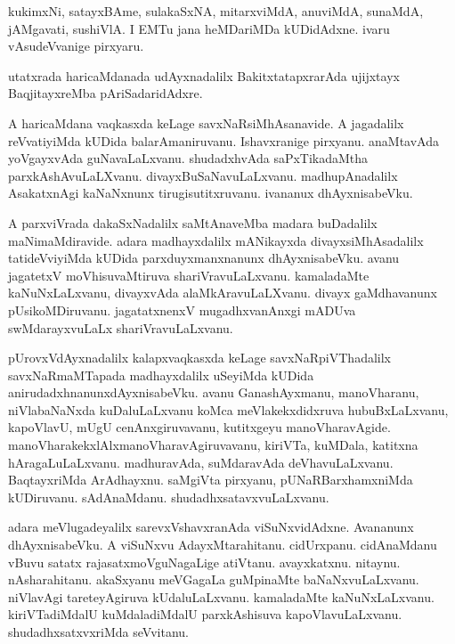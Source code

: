 \documentclass{article}
\begin{document}
\begin{mn}%
kukimxNi, satayxBAme, sulakaSxNA, mitarxviMdA, anuviMdA, sunaMdA, jAMgavati, sushiVlA. I 
EMTu jana heMDariMDa kUDidAdxne. ivaru vAsudeVvanige pirxyaru.
\end{mn}

\begin{mn}%
utatxrada haricaMdanada udAyxnadalilx BakitxtatapxrarAda ujijxtayx BaqjitayxreMba 
pAriSadaridAdxre.
\end{mn}

\begin{mn}%
A haricaMdana vaqkasxda keLage savxNaRsiMhAsanavide. A jagadalilx reVvatiyiMda kUDida 
balarAmaniruvanu. Ishavxranige pirxyanu. anaMtavAda yoVgayxvAda guNavaLaLxvanu. 
shudadxhvAda saPxTikadaMtha parxkAshAvuLaLXvanu. divayxBuSaNavuLaLxvanu. madhupAnadalilx 
AsakatxnAgi kaNaNxnunx tirugisutitxruvanu. ivananux dhAyxnisabeVku.
\end{mn}

\begin{mn}%
A parxviVrada dakaSxNadalilx saMtAnaveMba madara buDadalilx maNimaMdiravide. adara 
madhayxdalilx mANikayxda divayxsiMhAsadalilx tatideVviyiMda kUDida parxduyxmanxnanunx 
dhAyxnisabeVku. avanu jagatetxV moVhisuvaMtiruva shariVravuLaLxvanu. kamaladaMte 
kaNuNxLaLxvanu, divayxvAda alaMkAravuLaLXvanu. divayx gaMdhavanunx pUsikoMDiruvanu. 
jagatatxnenxV mugadhxvanAnxgi mADUva swMdarayxvuLaLx shariVravuLaLxvanu.
\end{mn}

\begin{mn}%
pUrovxVdAyxnadalilx kalapxvaqkasxda keLage savxNaRpiVThadalilx savxNaRmaMTapada 
madhayxdalilx uSeyiMda kUDida anirudadxhnanunxdAyxnisabeVku. avanu  GanashAyxmanu, 
manoVharanu, niVlabaNaNxda kuDaluLaLxvanu koMca meVlakekxdidxruva hubuBxLaLxvanu, 
kapoVlavU, mUgU cenAnxgiruvavanu, kutitxgeyu manoVharavAgide. 
manoVharakekxlAlxmanoVharavAgiruvavanu, kiriVTa, kuMDala, katitxna hAragaLuLaLxvanu. 
madhuravAda, suMdaravAda deVhavuLaLxvanu. BaqtayxriMda ArAdhayxnu. saMgiVta pirxyanu, 
pUNaRBarxhamxniMda kUDiruvanu. sAdAnaMdanu. shudadhxsatavxvuLaLxvanu.
\end{mn}

\begin{mn}%
adara meVlugadeyalilx sarevxVshavxranAda viSuNxvidAdxne. Avananunx dhAyxnisabeVku. A 
viSuNxvu AdayxMtarahitanu. cidUrxpanu. cidAnaMdanu vBuvu satatx rajasatxmoVguNagaLige 
atiVtanu. avayxkatxnu. nitaynu. nAsharahitanu. akaSxyanu meVGagaLa guMpinaMte 
baNaNxvuLaLxvanu. niVlavAgi tareteyAgiruva kUdaluLaLxvanu. kamaladaMte kaNuNxLaLxvanu. 
kiriVTadiMdalU kuMdaladiMdalU parxkAshisuva kapoVlavuLaLxvanu. shudadhxsatxvxriMda seVvitanu.
\end{mn}
\end{document}
